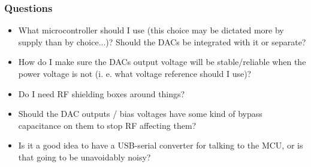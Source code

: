 \documentclass{beamer}
\begin{document}
    \begin{frame}
        \frametitle{Questions}

        \begin{itemize}
            \item What microcontroller should I use (this choice may be dictated more by supply than by choice...)? Should the DACs be integrated with it or separate?

            \item How do I make sure the DACs output voltage will be stable/reliable when the power voltage is not (i. e. what voltage reference should I use)?

            \item Do I need RF shielding boxes around things?

            \item Should the DAC outputs / bias voltages have some kind of bypass capacitance on them to stop RF affecting them?

            \item Is it a good idea to have a USB-serial converter for talking to the MCU, or is that going to be unavoidably noisy?
        \end{itemize}
    \end{frame}
\end{document}
